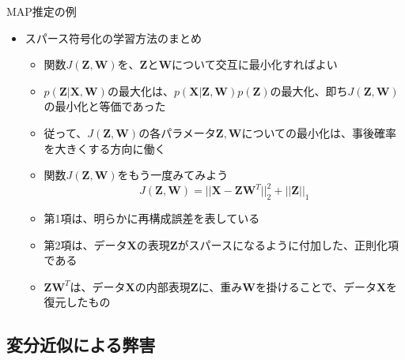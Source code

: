\documentclass[dvipdfmx,notheorems,t]{beamer}
\begin{document}
\begin{frame}{MAP推定の例}
\begin{itemize}
	\item スパース符号化の学習方法のまとめ
	\begin{itemize}
		\item 関数$J(\bm{Z}, \bm{W})$を、$\bm{Z}$と$\bm{W}$について\alert{交互に最小化}すればよい
		\newline
		\item $p(\bm{Z} | \bm{X}, \bm{W})$の最大化は、$p(\bm{X} | \bm{Z}, \bm{W}) p(\bm{Z})$の最大化、即ち$J(\bm{Z}, \bm{W})$の最小化と等価であった
		\item 従って、$J(\bm{Z}, \bm{W})$の各パラメータ$\bm{Z}, \bm{W}$についての最小化は、事後確率を大きくする方向に働く
		\newline
		\item 関数$J(\bm{Z}, \bm{W})$をもう一度みてみよう
		\begin{equation}
			J(\bm{Z}, \bm{W}) = || \bm{X} - \bm{Z} \bm{W}^T ||_2^2 + || \bm{Z} ||_1
		\end{equation}
		
		\item 第1項は、明らかに\alert{再構成誤差}を表している
		\item 第2項は、データ$\bm{X}$の表現$\bm{Z}$がスパースになるように付加した、\alert{正則化項}である
		\newline
		\item $\bm{Z} \bm{W}^T$は、データ$\bm{X}$の内部表現$\bm{Z}$に、重み$\bm{W}$を掛けることで、データ$\bm{X}$を復元したもの
	\end{itemize}
\end{itemize}

\end{frame}

\subsection{変分近似による弊害}
\end{document}
